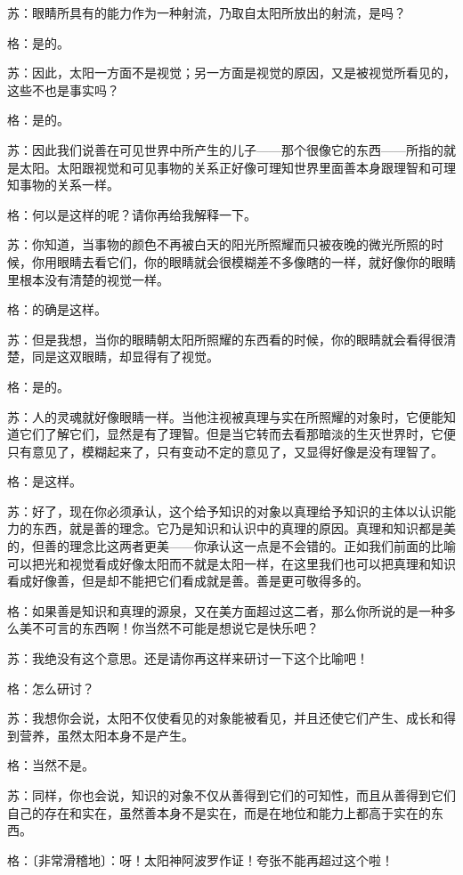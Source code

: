 \documentclass[12pt,oneside]{book}
\begin{document}
苏：眼睛所具有的能力作为一种射流，乃取自太阳所放出的射流，是吗？

格：是的。

苏：因此，太阳一方面不是视觉；另一方面是视觉的原因，又是被视觉所看见的，这些不也是事实吗？

格：是的。

苏：因此我们说善在可见世界中所产生的儿子——那个很像它的东西——所指的就是太阳。太阳跟视觉和可见事物的关系正好像可理知世界里面善本身跟理智和可理知事物的关系一样。

格：何以是这样的呢？请你再给我解释一下。

苏：你知道，当事物的颜色不再被白天的阳光所照耀而只被夜晚的微光所照的时候，你用眼睛去看它们，你的眼睛就会很模糊差不多像瞎的一样，就好像你的眼睛里根本没有清楚的视觉一样。

格：的确是这样。

苏：但是我想，当你的眼睛朝太阳所照耀的东西看的时候，你的眼睛就会看得很清楚，同是这双眼睛，却显得有了视觉。

格：是的。

苏：人的灵魂就好像眼睛一样。当他注视被真理与实在所照耀的对象时，它便能知道它们了解它们，显然是有了理智。但是当它转而去看那暗淡的生灭世界时，它便只有意见了，模糊起来了，只有变动不定的意见了，又显得好像是没有理智了。

格：是这样。

苏：好了，现在你必须承认，这个给予知识的对象以真理给予知识的主体以认识能力的东西，就是善的理念。它乃是知识和认识中的真理的原因。真理和知识都是美的，但善的理念比这两者更美——你承认这一点是不会错的。正如我们前面的比喻可以把光和视觉看成好像太阳而不就是太阳一样，在这里我们也可以把真理和知识看成好像善，但是却不能把它们看成就是善。善是更可敬得多的。

格：如果善是知识和真理的源泉，又在美方面超过这二者，那么你所说的是一种多么美不可言的东西啊！你当然不可能是想说它是快乐吧？

苏：我绝没有这个意思。还是请你再这样来研讨一下这个比喻吧！

格：怎么研讨？

苏：我想你会说，太阳不仅使看见的对象能被看见，并且还使它们产生、成长和得到营养，虽然太阳本身不是产生。

格：当然不是。

苏：同样，你也会说，知识的对象不仅从善得到它们的可知性，而且从善得到它们自己的存在和实在，虽然善本身不是实在，而是在地位和能力上都高于实在的东西。

格：〔非常滑稽地〕：呀！太阳神阿波罗作证！夸张不能再超过这个啦！
\end{document}
